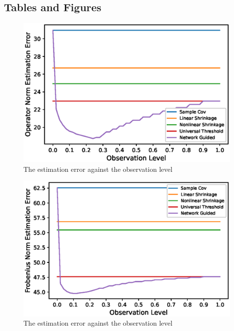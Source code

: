 \subsection{Tables and Figures}




\begin{figure}
    \centering
    \includegraphics{asset/observation-level-2.eps}
    \caption{The estimation error against the observation level}
    \label{fig:1}
\end{figure}
\begin{figure}
    \centering
    \includegraphics{asset/observation-level-fro.eps}
    \caption{The estimation error against the observation level}
    \label{fig:2}
\end{figure}
